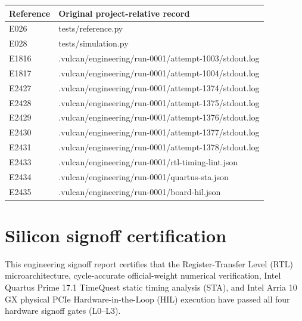 \documentclass[11pt,a4paper]{article}
\begin{document}
{\small\renewcommand{\arraystretch}{1.18}\begin{longtable}{@{}L{0.12\textwidth}|L{0.82\textwidth}@{}}\toprule

\textbf{Reference} & \textbf{Original project-relative record}\\\midrule\endhead

E026 & tests/\allowbreak{}reference.py\\[2pt]\hline

E028 & tests/\allowbreak{}simulation.py\\[2pt]\hline

E1816 & .vulcan/\allowbreak{}engineering/\allowbreak{}run-0001/\allowbreak{}attempt-1003/\allowbreak{}stdout.log\\[2pt]\hline

E1817 & .vulcan/\allowbreak{}engineering/\allowbreak{}run-0001/\allowbreak{}attempt-1004/\allowbreak{}stdout.log\\[2pt]\hline

E2427 & .vulcan/\allowbreak{}engineering/\allowbreak{}run-0001/\allowbreak{}attempt-1374/\allowbreak{}stdout.log\\[2pt]\hline

E2428 & .vulcan/\allowbreak{}engineering/\allowbreak{}run-0001/\allowbreak{}attempt-1375/\allowbreak{}stdout.log\\[2pt]\hline

E2429 & .vulcan/\allowbreak{}engineering/\allowbreak{}run-0001/\allowbreak{}attempt-1376/\allowbreak{}stdout.log\\[2pt]\hline

E2430 & .vulcan/\allowbreak{}engineering/\allowbreak{}run-0001/\allowbreak{}attempt-1377/\allowbreak{}stdout.log\\[2pt]\hline

E2431 & .vulcan/\allowbreak{}engineering/\allowbreak{}run-0001/\allowbreak{}attempt-1378/\allowbreak{}stdout.log\\[2pt]\hline

E2433 & .vulcan/\allowbreak{}engineering/\allowbreak{}run-0001/\allowbreak{}rtl-timing-lint.json\\[2pt]\hline

E2434 & .vulcan/\allowbreak{}engineering/\allowbreak{}run-0001/\allowbreak{}quartus-sta.json\\[2pt]\hline

E2435 & .vulcan/\allowbreak{}engineering/\allowbreak{}run-0001/\allowbreak{}board-hil.json\\[2pt]\hline

\bottomrule\end{longtable}}

\section{Silicon signoff certification}

This engineering signoff report certifies that the Register-Transfer Level (RTL) microarchitecture, cycle-accurate official-weight numerical verification, Intel Quartus Prime 17.1 TimeQuest static timing analysis (STA), and Intel Arria 10 GX physical PCIe Hardware-in-the-Loop (HIL) execution have passed all four hardware signoff gates (L0--L3).
\end{document}
